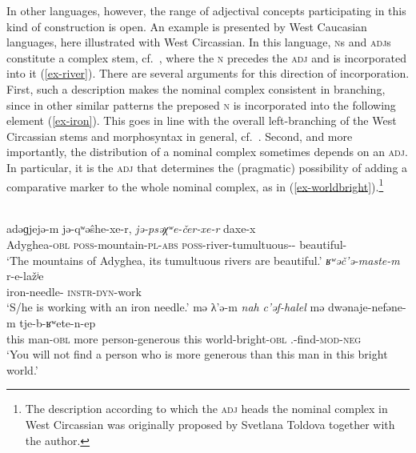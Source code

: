 \documentclass[output=paper
  ,nobabel
  ,draftmode
  ,colorlinks, citecolor=brown
]{langscibook}
\begin{document}
\largerpage[-1]
In other languages, however, the range of adjectival concepts participating in this kind of construction is open. An example is presented by West Caucasian languages, here illustrated with West Circassian. In this language, \textsc{n}s and \textsc{adj}s constitute a complex stem, cf.\ \citet{Lander2017}, where the \textsc{n} precedes the \textsc{adj}  and is incorporated into it (\ref{ex-river}). There are several arguments for this direction of incorporation. First, such a description makes the nominal complex consistent in branching, since in other similar patterns the preposed \textsc{n} is incorporated into the following element (\ref{ex-iron}). This goes in line with the overall left-branching of the West Circassian stems and morphosyntax in general, cf.\ \citet{KorotkovaLander2010}.  
Second, and more importantly, the distribution of a nominal complex sometimes depends on an \textsc{adj}. In particular, it is the \textsc{adj} that determines the (pragmatic) possibility of adding a comparative marker to the whole nominal complex, as in (\ref{ex-worldbright}).\footnote{The description according to which the \textsc{adj} heads the nominal complex in West Circassian was originally proposed by Svetlana Toldova together with the author.}

\newpage
\ea
{}\\
\ea
\label{ex-river}	
\gll adəɡjejə-m	    jə-qʷəŝhe-xe-r,    \emph{jə-psəχʷe-čer-xe-r}   		daxe-x\\
     Adyghea-\textsc{obl}   \textsc{poss}-mountain-\textsc{pl}-\textsc{abs} \textsc{poss}-river-tumultuous-\PL-\ABS{}	beautiful-\PL\\
\glt `The mountains of Adyghea, its tumultuous rivers are 	beautiful.'
\ex\label{ex-iron}
\gll	\emph{ʁʷəč’ə-maste-m}	r-e-lažʲe\\
		iron-needle-\OBL{}	\textsc{instr}-\textsc{dyn}-work\\
\glt `S/he is working with an iron needle.'
\ex\label{ex-worldbright}
\gll	mə	λ’ə-m	\emph{nah}	\emph{c’əf-halel}	mə	dwənaje-nefəne-m      		tje-b-ʁʷete-n-ep\\
	this	man-\textsc{obl} more	person-generous	this	world-bright-\textsc{obl}		\SG.\ERG-find-\textsc{mod}-\textsc{neg}\\
\glt `You will not find a person who is more generous than this man in this bright world.'

\z
\z
\end{document}
